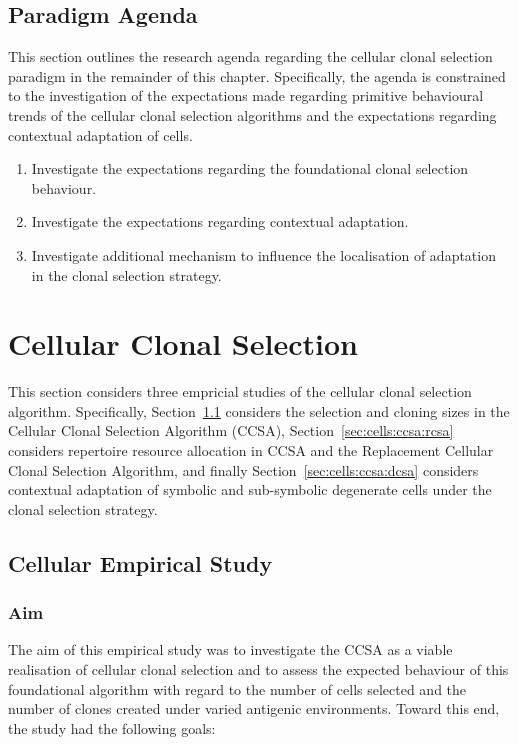 %
%
\subsection{Paradigm Agenda}
\label{sec:cells:realised:agenda}
This section outlines the research agenda regarding the cellular clonal selection paradigm in the remainder of this chapter. Specifically, the agenda is constrained to the investigation of the expectations made regarding primitive behavioural trends of the cellular clonal selection algorithms and the expectations regarding contextual adaptation of cells.

\begin{enumerate}
	\item Investigate the expectations regarding the foundational clonal selection behaviour.
	\item Investigate the expectations regarding contextual adaptation.
	\item Investigate additional mechanism to influence the localisation of adaptation in the clonal selection strategy.	
\end{enumerate}

%
%
\section{Cellular Clonal Selection}
\label{sec:cells:ccsa}
This section considers three empricial studies of the cellular clonal selection algorithm. Specifically, Section~\ref{sec:cells:ccsa:ccsa} considers the selection and cloning sizes in the Cellular Clonal Selection Algorithm (CCSA), Section~\ref{sec:cells:ccsa:rcsa} considers repertoire resource allocation in CCSA and the Replacement Cellular Clonal Selection Algorithm, and finally Section~\ref{sec:cells:ccsa:dcsa} considers contextual adaptation of symbolic and sub-symbolic degenerate cells under the clonal selection strategy.

%
%
\subsection{Cellular Empirical Study}
\label{sec:cells:ccsa:ccsa}

%
%
\subsubsection{Aim}
The aim of this empirical study was to investigate the CCSA as a viable realisation of cellular clonal selection and to assess the expected behaviour of this foundational algorithm with regard to the number of cells selected and the number of clones created under varied antigenic environments. Toward this end, the study had the following goals:

